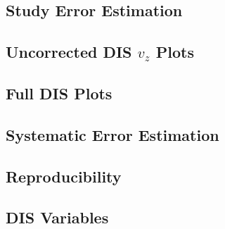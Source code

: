 \subsection*{Study Error Estimation}


\subsection*{Uncorrected DIS $v_z$ Plots}


\subsection*{Full DIS Plots}


\subsection*{Systematic Error Estimation}


\subsection*{Reproducibility}


\subsection*{DIS Variables}


